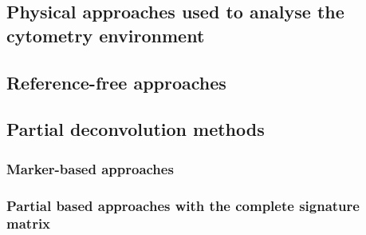 \subsection{Physical approaches used to analyse the cytometry environment}

\subsection{Reference-free approaches}

\subsection{Partial deconvolution methods}

\subsubsection{Marker-based approaches}

\subsubsection{Partial based approaches with the complete signature matrix}




